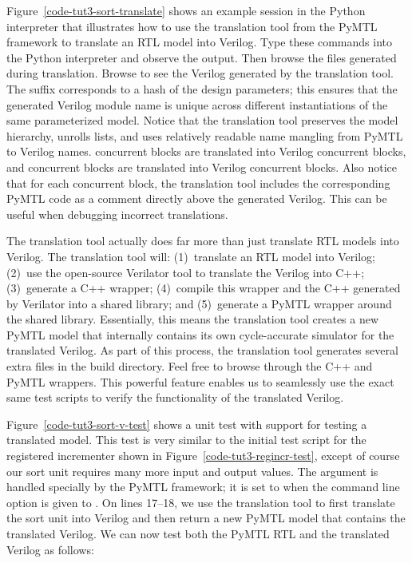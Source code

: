 \documentclass{cbxdoc}
\begin{document}
Figure~\ref{code-tut3-sort-translate} shows an example session in the
Python interpreter that illustrates how to use the translation tool from
the PyMTL framework to translate an RTL model into Verilog. Type these
commands into the Python interpreter and observe the output. Then browse
the files generated during translation. Browse
 to see the Verilog generated by
the translation tool. The suffix  corresponds to a
hash of the design parameters; this ensures that the generated Verilog
module name is unique across different instantiations of the same
parameterized model. Notice that the translation tool preserves the model
hierarchy, unrolls lists, and uses relatively readable name mangling from
PyMTL to Verilog names.  concurrent blocks are translated
into Verilog  concurrent blocks, and
 concurrent blocks are translated into Verilog
 concurrent blocks. Also notice that for each concurrent
block, the translation tool includes the corresponding PyMTL code as a
comment directly above the generated Verilog. This can be useful when
debugging incorrect translations.



The translation tool actually does far more than just translate RTL
models into Verilog. The translation tool will: (1)~translate an RTL
model into Verilog; (2)~use the open-source Verilator tool to translate
the Verilog into C++; (3)~generate a C++ wrapper; (4)~compile this
wrapper and the C++ generated by Verilator into a shared library; and
(5)~generate a PyMTL wrapper around the shared library. Essentially, this
means the translation tool creates a new PyMTL model that internally
contains its own cycle-accurate simulator for the translated Verilog. As
part of this process, the translation tool generates several extra files
in the build directory. Feel free to browse through the C++ and PyMTL
wrappers. This powerful feature enables us to seamlessly use the exact
same test scripts to verify the functionality of the translated Verilog.



Figure~\ref{code-tut3-sort-v-test} shows a unit test with support for
testing a translated model. This test is very similar to the initial test
script for the registered incrementer shown in
Figure~\ref{code-tut3-regincr-test}, except of course our sort unit
requires many more input and output values. The 
argument is handled specially by the PyMTL framework; it is set to
 when the  command line option is given to
. On lines 17--18, we use the translation tool to first
translate the sort unit into Verilog and then return a new PyMTL model
that contains the translated Verilog. We can now test both the PyMTL RTL
and the translated Verilog as follows:
\end{document}
